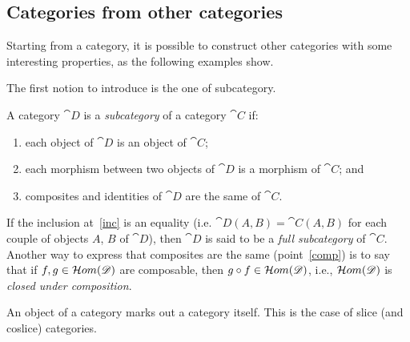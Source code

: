 \iffalse

\subsection{Categories from other categories}\label{ssect:cats_from_cats}

Starting from a category, it is possible to construct other categories with some interesting properties, as the following examples show.

The first notion to introduce is the one of subcategory.

\begin{definition}[Subcategory]
    A category $\cat{D}$ is a \emph{subcategory} of a category $\cat{C}$ if:
    \begin{enumerate}
        \item each object of $\cat{D}$ is an object of $\cat{C}$;
        \item \label{inc} each morphism between two objects of $\cat{D}$ is a morphism of $\cat{C}$; and
        \item \label{comp} composites and identities of $\cat{D}$ are the same of $\cat{C}$.
    \end{enumerate}

    If the inclusion at~\ref{inc} is an equality (i.e. $\cat{D}(A, B) = \cat{C}(A, B)$ for each couple of objects $A$, $B$ of $\cat{D}$), then $\cat{D}$ is said to be a \emph{full subcategory} of $\cat{C}$.
    Another way to express that composites are the same (point~\ref{comp}) is to say that if $f, g \in \mathcal{H}om(\mathscr{D})$ are composable, then $g \circ f \in \mathcal{H}om(\mathscr{D})$, i.e., $\mathcal{H}om(\mathscr{D})$ is \emph{closed under composition}.
\end{definition}

An object of a category marks out a category itself. This is the case of slice (and coslice) categories.

